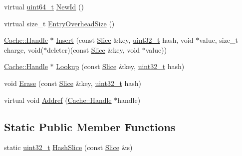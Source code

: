 \begin{DoxyCompactItemize}
\item 
virtual \hyperlink{stdint_8h_aaa5d1cd013383c889537491c3cfd9aad}{uint64\+\_\+t} \hyperlink{classleveldb_1_1anonymous__namespace_02cache_8cc_03_1_1_l_r_u_cache_a21ef97b21cc543212b009943027b65c9}{New\+Id} ()
\item 
virtual size\+\_\+t \hyperlink{classleveldb_1_1anonymous__namespace_02cache_8cc_03_1_1_l_r_u_cache_a71d8dbf19fce0a1febefee977d5359de}{Entry\+Overhead\+Size} ()
\item 
\hyperlink{structleveldb_1_1_cache_1_1_handle}{Cache\+::\+Handle} $\ast$ \hyperlink{classleveldb_1_1anonymous__namespace_02cache_8cc_03_1_1_l_r_u_cache_a22a5f1b523657467823d42e8155ac83a}{Insert} (const \hyperlink{classleveldb_1_1_slice}{Slice} \&key, \hyperlink{stdint_8h_a435d1572bf3f880d55459d9805097f62}{uint32\+\_\+t} hash, void $\ast$value, size\+\_\+t charge, void($\ast$deleter)(const \hyperlink{classleveldb_1_1_slice}{Slice} \&key, void $\ast$value))
\item 
\hyperlink{structleveldb_1_1_cache_1_1_handle}{Cache\+::\+Handle} $\ast$ \hyperlink{classleveldb_1_1anonymous__namespace_02cache_8cc_03_1_1_l_r_u_cache_ad6a38b5985b6860846403db8d160326b}{Lookup} (const \hyperlink{classleveldb_1_1_slice}{Slice} \&key, \hyperlink{stdint_8h_a435d1572bf3f880d55459d9805097f62}{uint32\+\_\+t} hash)
\item 
void \hyperlink{classleveldb_1_1anonymous__namespace_02cache_8cc_03_1_1_l_r_u_cache_ab43f8be89d3243ee69d95e9708a03274}{Erase} (const \hyperlink{classleveldb_1_1_slice}{Slice} \&key, \hyperlink{stdint_8h_a435d1572bf3f880d55459d9805097f62}{uint32\+\_\+t} hash)
\item 
virtual void \hyperlink{classleveldb_1_1anonymous__namespace_02cache_8cc_03_1_1_l_r_u_cache_ad849ce266b8d8e0b0034841ffc1c5910}{Addref} (\hyperlink{structleveldb_1_1_cache_1_1_handle}{Cache\+::\+Handle} $\ast$handle)
\end{DoxyCompactItemize}
\subsection*{Static Public Member Functions}
\begin{DoxyCompactItemize}
\item 
static \hyperlink{stdint_8h_a435d1572bf3f880d55459d9805097f62}{uint32\+\_\+t} \hyperlink{classleveldb_1_1anonymous__namespace_02cache_8cc_03_1_1_l_r_u_cache_a598ce7806fc80a6a71b7f45e70d44646}{Hash\+Slice} (const \hyperlink{classleveldb_1_1_slice}{Slice} \&s)
\end{DoxyCompactItemize}
